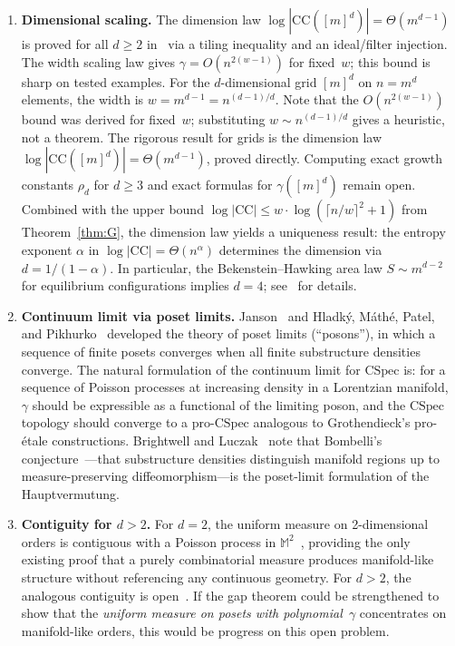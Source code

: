 \documentclass[11pt,a4paper]{article}
\theoremstyle{plain}
\theoremstyle{definition}
\theoremstyle{remark}
\newcommand{\CSpec}{\mathrm{CSpec}}
\newcommand{\CC}{\mathrm{CC}}
\begin{document}
\begin{enumerate}
\item \textbf{Dimensional scaling.}
The dimension law $\log|\CC([m]^d)| = \Theta(m^{d-1})$ is proved for all $d \geq 2$ in~\cite{difiore2026grid} via a tiling inequality and an ideal/filter injection.
The width scaling law gives $\gamma = O(n^{2(w-1)})$ for fixed~$w$; this bound is sharp on tested examples.
For the $d$-dimensional grid $[m]^d$ on $n = m^d$ elements, the width is $w = m^{d-1} = n^{(d-1)/d}$.
Note that the $O(n^{2(w-1)})$ bound was derived for fixed~$w$; substituting $w \sim n^{(d-1)/d}$ gives a heuristic, not a theorem.
The rigorous result for grids is the dimension law $\log|\CC([m]^d)| = \Theta(m^{d-1})$, proved directly.
Computing exact growth constants $\rho_d$ for $d \geq 3$ and exact formulas for $\gamma([m]^d)$ remain open.
Combined with the upper bound $\log|\CC| \leq w \cdot \log(\lceil n/w \rceil^2 + 1)$ from Theorem~\ref{thm:G}, the dimension law yields a uniqueness result: the entropy exponent $\alpha$ in $\log|\CC| = \Theta(n^\alpha)$ determines the dimension via $d = 1/(1-\alpha)$.
In particular, the Bekenstein--Hawking area law $S \sim m^{d-2}$ for equilibrium configurations implies $d = 4$; see~\cite{difiore2026bh} for details.

\item \textbf{Continuum limit via poset limits.}
Janson~\cite{janson2011} and Hladk\'y, M\'ath\'e, Patel, and Pikhurko~\cite{hladky2015} developed the theory of poset limits (``posons''), in which a sequence of finite posets converges when all finite substructure densities converge.
The natural formulation of the continuum limit for $\CSpec$ is: for a sequence of Poisson processes at increasing density in a Lorentzian manifold, $\gamma$ should be expressible as a functional of the limiting poson, and the $\CSpec$ topology should converge to a pro-$\CSpec$ analogous to Grothendieck's pro-\'etale constructions.
Brightwell and Luczak~\cite{brightwell2015} note that Bombelli's conjecture~\cite{bombelli2000}---that substructure densities distinguish manifold regions up to measure-preserving diffeomorphism---is the poset-limit formulation of the Hauptvermutung.

\item \textbf{Contiguity for $d > 2$.}
For $d = 2$, the uniform measure on 2-dimensional orders is contiguous with a Poisson process in $\mathbb{M}^2$~\cite{elzahar1988, brightwell2008}, providing the only existing proof that a purely combinatorial measure produces manifold-like structure without referencing any continuous geometry.
For $d > 2$, the analogous contiguity is open~\cite{brightwell2015}.
If the gap theorem could be strengthened to show that the \emph{uniform measure on posets with polynomial~$\gamma$} concentrates on manifold-like orders, this would be progress on this open problem.


\end{enumerate}
\end{document}
